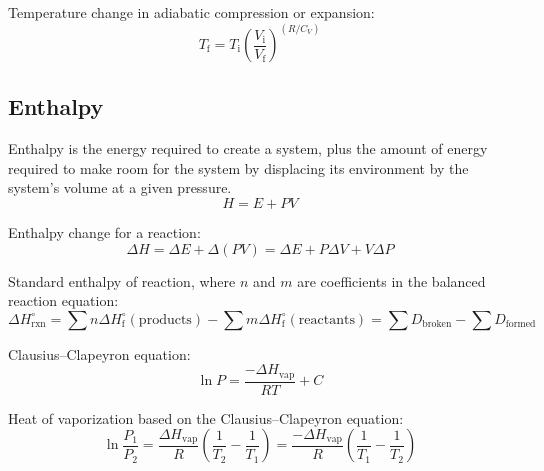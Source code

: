 \documentclass[10pt]{article}
\def\not{^\circ}
\begin{document}
Temperature change in adiabatic compression or expansion:
\begin{equation*}
T_\textrm{f} = T_\textrm{i}\left(\frac{V_\textrm{i}}{V_\textrm{f}}\right)^{(R/C_V)}
\end{equation*}



\vspace*{0.5cm}
\subsection{Enthalpy}

Enthalpy is the energy required to create a system, plus the amount of energy required to make room for the system by displacing its environment by the system's volume at a given pressure.
\begin{equation*}
H = E + PV
\end{equation*}

Enthalpy change for a reaction:
\begin{equation*}
\Delta H = \Delta E + \Delta(PV) = \Delta E + P\Delta V + V\Delta P
\end{equation*}

Standard enthalpy of reaction, where $n$ and $m$ are coefficients in the balanced reaction equation:
\begin{equation*}
\Delta H\not_\textrm{rxn} = \sum{n\Delta H\not_\textrm{f}(\textrm{products})}-\sum{m\Delta H\not_\textrm{f}(\textrm{reactants})} = \sum{D_\textrm{broken}} - \sum{D_\textrm{formed}} 
\end{equation*}

Clausius--Clapeyron equation:
\begin{equation*}
\ln P = \frac{-\Delta H_\textrm{vap}}{RT}+C
\end{equation*}

Heat of vaporization based on the Clausius--Clapeyron equation:
\begin{equation*}
\ln \frac{P_1}{P_2} = \frac{\Delta H_\textrm{vap}}{R}\left(\frac{1}{T_2} - \frac{1}{T_1}\right) = \frac{-\Delta H_\textrm{vap}}{R}\left(\frac{1}{T_1} - \frac{1}{T_2}\right)
\end{equation*}
\end{document}
